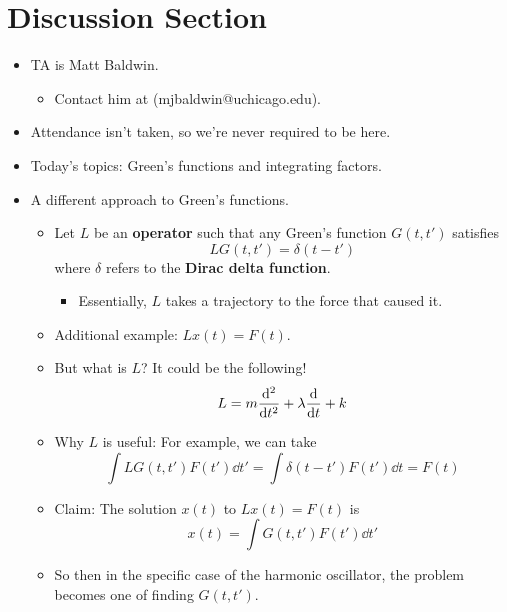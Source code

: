 \documentclass[../notes.tex]{subfiles}
\begin{document}
\section{Discussion Section}
\begin{itemize}
    \item TA is Matt Baldwin.
    \begin{itemize}
        \item Contact him at (mjbaldwin@uchicago.edu).
    \end{itemize}
    \item Attendance isn't taken, so we're never required to be here.
    \item Today's topics: Green's functions and integrating factors.
    \item A different approach to Green's functions.
    \begin{itemize}
        \item Let $L$ be an \textbf{operator} such that any Green's function $G(t,t')$ satisfies
        \begin{equation*}
            LG(t,t') = \delta(t-t')
        \end{equation*}
        where $\delta$ refers to the \textbf{Dirac delta function}.
        \begin{itemize}
            \item Essentially, $L$ takes a trajectory to the force that caused it.
        \end{itemize}
        \item Additional example: $Lx(t)=F(t)$.
        \item But what is $L$? It could be the following!
        \begin{equation*}
            L = m\dv[2]{t}+\lambda\dv{t}+k
        \end{equation*}
        \item Why $L$ is useful: For example, we can take
        \begin{equation*}
            \int LG(t,t')F(t')\dd{t'} = \int\delta(t-t')F(t')\dd{t}
            = F(t)
        \end{equation*}
        \item Claim: The solution $x(t)$ to $Lx(t)=F(t)$ is
        \begin{equation*}
            x(t) = \int G(t,t')F(t')\dd{t'}
        \end{equation*}
        \item So then in the specific case of the harmonic oscillator, the problem becomes one of finding $G(t,t')$.

\end{itemize}
\end{itemize}
\end{document}
